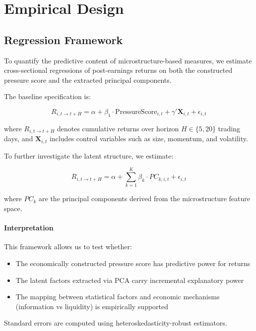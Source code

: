 
\section{Empirical Design}

\subsection{Regression Framework}

To quantify the predictive content of microstructure-based measures, we estimate cross-sectional regressions of post-earnings returns on both the constructed pressure score and the extracted principal components.

The baseline specification is:

\begin{equation}
R_{i,t \rightarrow t+H} = \alpha + \beta_1 \cdot \text{PressureScore}_{i,t} + \gamma' \mathbf{X}_{i,t} + \epsilon_{i,t}
\end{equation}

where $R_{i,t \rightarrow t+H}$ denotes cumulative returns over horizon $H \in \{5,20\}$ trading days, and $\mathbf{X}_{i,t}$ includes control variables such as size, momentum, and volatility.

To further investigate the latent structure, we estimate:

\begin{equation}
R_{i,t \rightarrow t+H} = \alpha + \sum_{k=1}^{K} \beta_k \cdot PC_{k,i,t} + \epsilon_{i,t}
\end{equation}

where $PC_k$ are the principal components derived from the microstructure feature space.

\paragraph{Interpretation}

This framework allows us to test whether:
\begin{itemize}
    \item The economically constructed pressure score has predictive power for returns
    \item The latent factors extracted via PCA carry incremental explanatory power
    \item The mapping between statistical factors and economic mechanisms (information vs liquidity) is empirically supported
\end{itemize}

Standard errors are computed using heteroskedasticity-robust estimators.
